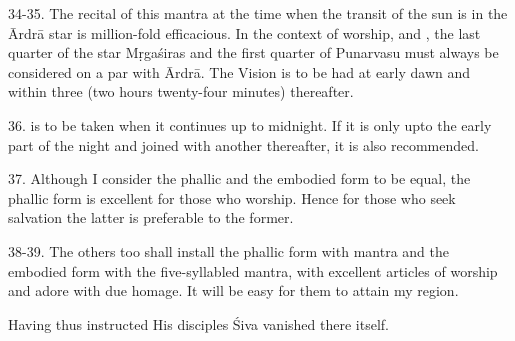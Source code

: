 34-35. The recital of this mantra at the time when the transit of the sun is in
the Ārdrā star is million-fold efficacious. In the context of worship, 
and , the last quarter of the star Mṛgaśiras and the first quarter
of Punarvasu must always be considered on a par with Ārdrā. The Vision is to be
had at early dawn and within three  (two hours twenty-four minutes)
thereafter.

36.  is to be taken when it continues up to midnight. If it is
only upto the early part of the night and joined with another thereafter, it is
also recommended.

37. Although I consider the phallic and the embodied form to be equal,
the phallic form is excellent for those who worship. Hence for those who seek
salvation the latter is preferable to the former.

38-39. The others too shall install the phallic form with  mantra and
the embodied form with the five-syllabled mantra, with excellent articles of
worship and adore with due homage. It will be easy for them to attain my region.

Having thus instructed His disciples Śiva vanished there itself.
